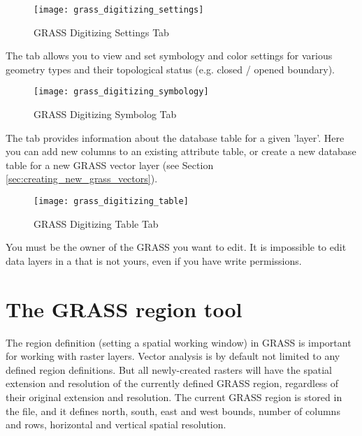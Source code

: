 \begin{figure}[h]
 \centering
 \texttt{[image: grass\_digitizing\_settings]}
 \caption{GRASS Digitizing Settings Tab \nixcaption}\label{fig:grass_digitizing_settings}
\end{figure}


The  tab allows you to view and set symbology and color
settings for various geometry types and their topological status (e.g. closed
/ opened boundary).

\begin{figure}[h]
 \centering
 \texttt{[image: grass\_digitizing\_symbology]}
 \caption{GRASS Digitizing Symbolog Tab \nixcaption}\label{fig:grass_digitizing_symbology}
\end{figure}

 

The  tab provides information about the database table for
a given 'layer'. Here you can add new columns to an existing attribute table,
or create a new database table for a new GRASS vector layer (see Section
\ref{sec:creating_new_grass_vectors}).

\begin{figure}[h]
 \centering
 \texttt{[image: grass\_digitizing\_table]}
 \caption{GRASS Digitizing Table Tab \nixcaption}\label{fig:grass_digitizing_table}
 \end{figure}

\begin{Tip}\caption{\textsc{GRASS Edit Permissions}}
You must be the owner of the GRASS  you want to
edit. It is impossible to edit data layers in a  that is not
yours, even if you have write permissions.
\end{Tip}

\section{The GRASS region tool}\label{sec:grass_region}

The region definition (setting a spatial working window) in GRASS is important
for working with raster layers. Vector analysis is by default not limited
to any defined region definitions. But all newly-created rasters will have the
spatial extension and resolution of the currently defined GRASS region,
regardless of their original extension and resolution. The current GRASS
region is stored in the  file, and it
defines north, south, east and west bounds, number of columns and rows,
horizontal and vertical spatial resolution.

